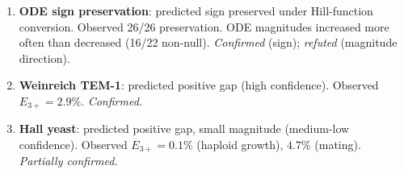 \documentclass[10pt]{article}
\begin{document}
\begin{enumerate}
\item \textbf{ODE sign preservation}: predicted sign preserved under
  Hill-function conversion. Observed 26/26 preservation. ODE
  magnitudes increased more often than decreased (16/22 non-null).
  \emph{Confirmed} (sign); \emph{refuted} (magnitude direction).

\item \textbf{Weinreich TEM-1}: predicted positive gap (high
  confidence). Observed $E_{3+} = 2.9\%$. \emph{Confirmed.}

\item \textbf{Hall yeast}: predicted positive gap, small magnitude
  (medium-low confidence). Observed $E_{3+} = 0.1\%$ (haploid
  growth), $4.7\%$ (mating). \emph{Partially confirmed.}
\end{enumerate}
\end{document}
